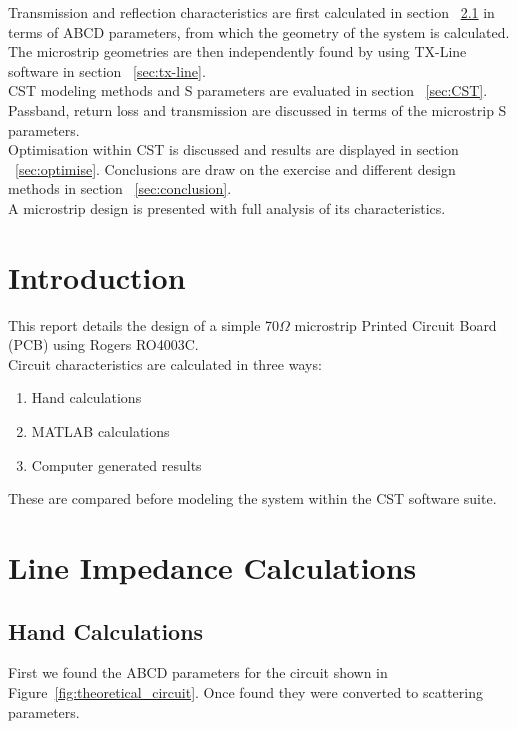 \documentclass{paper}
\begin{document}
Transmission and reflection characteristics are first calculated in section ~\ref{sec:handcalcs} in terms of ABCD parameters, from which the geometry of the system is calculated. The microstrip geometries are then independently found by using TX-Line software in section ~\ref{sec:tx-line}.\\

CST modeling methods and S parameters are evaluated in section ~\ref{sec:CST}. Passband, return loss and transmission are discussed in terms of the microstrip S parameters.\\

Optimisation within CST is discussed and results are displayed in section ~\ref{sec:optimise}. Conclusions are draw on the exercise and different design methods in section ~\ref{sec:conclusion}.\\

A microstrip design is presented with full analysis of its characteristics.\\ 

\newpage
\tableofcontents

\newpage
\section{Introduction}
This report details the design of a simple 70$\Omega$ microstrip Printed Circuit Board (PCB) using Rogers RO4003C. \\

Circuit characteristics are calculated in three ways:

\begin{enumerate}
	\item Hand calculations
	\item MATLAB calculations
	\item Computer generated results\\
\end{enumerate}

These are compared before modeling the system within the CST software suite.\\
\newpage
\section{Line Impedance Calculations}
\subsection{Hand Calculations}
\label{sec:handcalcs}
First we found the ABCD parameters for the circuit shown in Figure~\ref{fig:theoretical_circuit}. Once found they were converted to scattering parameters.
\end{document}

